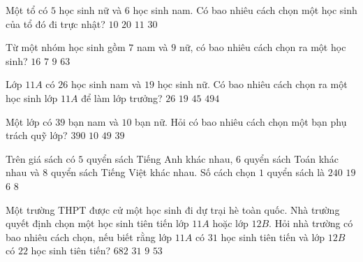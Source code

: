 \begin{ex}%
	Một tổ có $5$ học sinh nữ và $6$ học sinh nam. Có bao nhiêu cách chọn một học sinh của tổ đó đi trực nhật?
	\choice
	{$10$}
	{$20$}
	{\True $11$}
	{$30$}
\end{ex}

\begin{ex}%
	Từ một nhóm học sinh gồm $ 7 $ nam và $ 9 $ nữ, có bao nhiêu cách chọn ra một học sinh?
	\choice
	{\True $ 16 $}
	{$ 7 $}
	{$ 9 $}
	{$ 63 $}
\end{ex}

\begin{ex}%
	Lớp $11A$ có $26$ học sinh nam và $19$ học sinh nữ. Có bao nhiêu cách chọn ra một học sinh lớp $11A$ để làm lớp trưởng?
	\choice
	{$26$}
	{$19$}
	{\True$45$}
	{$494$}
\end{ex}

\begin{ex}%
	Một lớp có $39$ bạn nam và $10$ bạn nữ. Hỏi có bao nhiêu cách chọn một bạn phụ trách quỹ lớp?
	\choice
	{$390$}
	{$10$}
	{\True $49$}
	{$39$}
\end{ex}


\begin{ex}%
	Trên giá sách có $5$ quyển sách Tiếng Anh khác nhau, $6$ quyển sách Toán khác nhau và $8$ quyển sách Tiếng Việt khác nhau. Số cách chọn $1$ quyển sách là
	\choice
	{$240$}
	{\True $19$}
	{$6$}
	{$8$}
\end{ex}

\begin{ex}%
	Một trường THPT được cử một học sinh đi dự trại hè toàn quốc. Nhà trường quyết định chọn một học sinh tiên tiến lớp $11A$ hoặc lớp $12B$. Hỏi nhà trường có bao nhiêu cách chọn, nếu biết rằng lớp $11A$ có $31$ học sinh tiên tiến và lớp $12B$ có $22$ học sinh tiên tiến?
	\choice
	{$682$}
	{$31$}
	{$9$}
	{\True $53$}
\end{ex}

